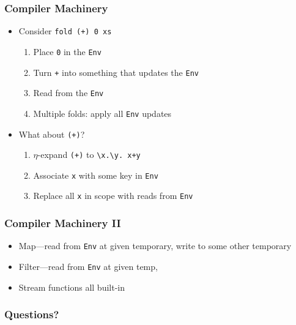 \documentclass{beamer}
\begin{document}
\begin{frame}[fragile]
  \frametitle{Compiler Machinery}
  \begin{itemize}
    \item Consider \verb|fold (+) 0 xs|
    \begin{enumerate}
      \item Place \verb|0| in the \verb|Env|
      \item Turn \verb|+| into something that updates the \verb|Env|
      \item Read from the \verb|Env|
      \item Multiple folds: apply all \verb|Env| updates
    \end{enumerate}
    \item What about \verb|(+)|?
    \begin{enumerate}
      \item $\eta$-expand \verb|(+)| to \verb|\x.\y. x+y|
      \item Associate \verb|x| with some key in \verb|Env|
      \item Replace all \verb|x| in scope with reads from \verb|Env| %
    \end{enumerate}
  \end{itemize}
\end{frame}

\begin{frame}[fragile]
  \frametitle{Compiler Machinery II}
  \begin{itemize}
    \item Map---read from \verb|Env| at given temporary, write to some other temporary
    \item Filter---read from \verb|Env| at given temp,
    \item Stream functions all built-in
  \end{itemize}
\end{frame}


\begin{frame}
  \frametitle{Questions?}
\end{frame}
\end{document}
